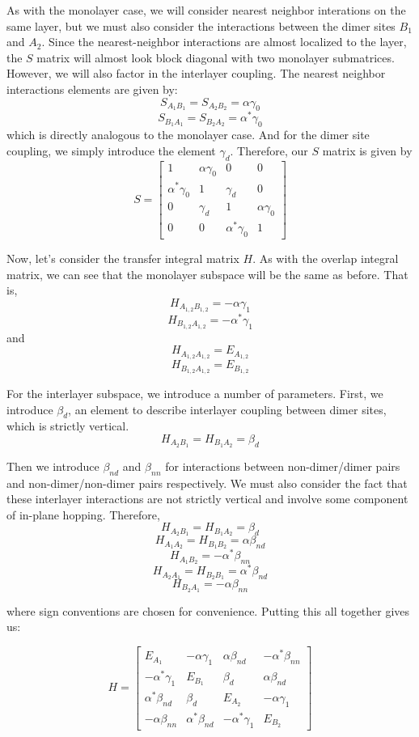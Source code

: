 \documentclass{article}
\begin{document}
As with the monolayer case, we will consider nearest neighbor interations on the same layer, but we must also consider the interactions between the dimer sites $B_{1}$ and $A_{2}$. Since the nearest-neighbor
interactions are almost localized to the layer, the $S$ matrix will almost look block diagonal with two monolayer submatrices. However, we will also factor in the interlayer coupling. The nearest neighbor
interactions elements are given by:
$$ S_{A_{1}B_{1}} = S_{A_{2}B_{2}}= \alpha\gamma_{0}$$
$$ S_{B_{1}A_{1}} = S_{B_{2}A_{2}} = \alpha^{*}\gamma_{0} $$
which is directly analogous to the monolayer case. And for the dimer site coupling, we simply introduce the element $\gamma_{d}$.
Therefore, our $S$ matrix is given by
$$ S =
\begin{bmatrix}
1 & \alpha\gamma_{0} & 0 & 0\\
\alpha^{*}\gamma_{0} & 1 & \gamma_{d} & 0\\
0 & \gamma_{d} & 1 & \alpha\gamma_{0} \\
0 & 0 & \alpha^{*}\gamma_{0} & 1
\end{bmatrix}
$$

Now, let's consider the transfer integral matrix $H$. As with the overlap integral matrix, we can see that the monolayer subspace will be
the same as before. That is,
$$H_{A_{1,2}B_{1,2}} = -\alpha\gamma_{1}$$
$$H_{B_{1,2}A_{1,2}} = -\alpha^{*}\gamma_{1}$$
and
$$H_{A_{1,2}A_{1,2}} = E_{A_{1,2}}$$
$$H_{B_{1,2}A_{1,2}} = E_{B_{1,2}}$$

For the interlayer subspace, we introduce a number of parameters. First, we introduce $\beta_{d}$, an element to describe interlayer
coupling between dimer sites, which is strictly vertical.
$$ H_{A_{2}B_{1}} = H_{B_{1}A_{2}} = \beta_{d} $$

Then we introduce $\beta_{nd}$ and $\beta_{nn}$ for interactions between non-dimer/dimer pairs and non-dimer/non-dimer pairs respectively.
We must also consider the fact that these interlayer interactions are not strictly vertical and involve some component of in-plane
hopping. Therefore,
$$ H_{A_{2}B_{1}} = H_{B_{1}A_{2}} = \beta_{d} $$
$$ H_{A_{1}A_{2}} = H_{B_{1}B_{2}} = \alpha\beta_{nd} $$
$$ H_{A_{1}B_{2}} = -\alpha^{*}\beta_{nn} $$
$$ H_{A_{2}A_{1}} = H_{B_{2}B_{1}} = \alpha^{*}\beta_{nd} $$
$$ H_{B_{2}A_{1}} = -\alpha\beta_{nn} $$

where sign conventions are chosen for convenience. Putting this all together gives us:

$$ H =
\begin{bmatrix}
E_{A_{1}} & -\alpha\gamma_{1} & \alpha\beta_{nd} & -\alpha^{*}\beta_{nn}\\
-\alpha^{*}\gamma_{1} & E_{B_{1}} & \beta_{d} & \alpha\beta_{nd}\\
\alpha^{*}\beta_{nd} & \beta_{d} & E_{A_{2}} & -\alpha\gamma_{1} \\
-\alpha\beta_{nn} & \alpha^{*}\beta_{nd} & -\alpha^{*}\gamma_{1} & E_{B_{2}}
\end{bmatrix}
$$
\end{document}
